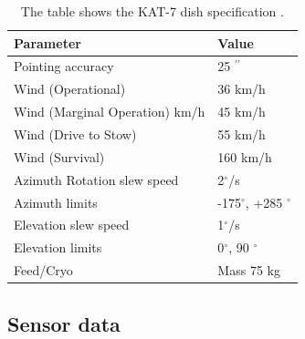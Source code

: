 \begin{table}[H]\centering
\begin{tabular}{l l }
\toprule
\textbf{Parameter} & \textbf{Value}\\
\midrule
Pointing accuracy & 25 $^{\prime \prime}$ \\
Wind (Operational) & 36 km/h\\
Wind (Marginal Operation) km/h & 45 km/h\\
Wind (Drive to Stow) & 55 km/h\\
Wind (Survival) & 160 km/h\\
Azimuth Rotation slew speed &  2$^\circ$/s\\
Azimuth limits & -175$^{\circ}$, +285 $^{\circ}$\\
Elevation slew speed & 1$^{\circ}$/s\\
Elevation limits & 0$^{\circ}$, 90 $^{\circ}$\\
Feed/Cryo & Mass 75 kg\\
\bottomrule
\end{tabular}
\caption{The table shows the KAT-7 dish specification \citep{foley2016engineering}.}
\label{DSpec}
\end{table}

\subsection{Sensor data}

